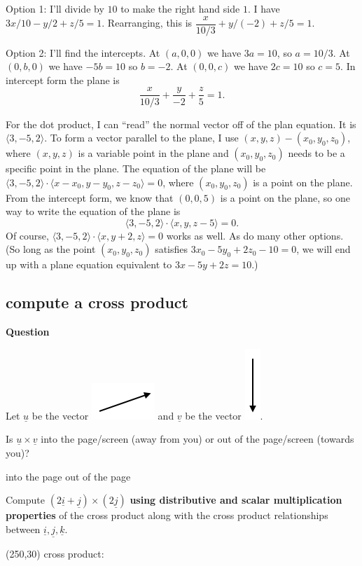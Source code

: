 \documentclass[12pt,letterpaper,noanswers]{exam}
\newcommand{\mb}[1]{\underline{#1}}
\begin{document}
Option 1: I'll divide by $10$ to make the right hand side $1$.  I have $3x/10 - y/2 + z/5 = 1$.  Rearranging, this is $\dfrac{x}{10/3} + y/(-2) + z/5 = 1$.

Option 2: I'll find the intercepts.  At $(a,0,0)$ we have $3a = 10$, so $a = 10/3$.  At $(0,b,0)$ we have $-5b = 10$ so $b = -2$.  At $(0,0,c)$ we have $2c = 10$ so $c=5$.  In intercept form the plane is \[\frac{x}{10/3}+\frac{y}{-2}+\frac{z}{5} = 1.\]

For the dot product, I can ``read'' the normal vector off of the plan equation.  It is $\langle 3,-5,2\rangle$.  To form a vector parallel to the plane, I use $(x,y,z) - (x_0,y_0,z_0)$, where $(x,y,z)$ is a variable point in the plane and $(x_0,y_0,z_0)$ needs to be a specific point in the plane.  The equation of the plane will be $\langle 3,-5,2\rangle \cdot \langle x-x_0,y-y_0,z-z_0\rangle = 0$, where $(x_0,y_0,z_0)$ is a point on the plane.  From the intercept form, we know that $(0,0,5)$ is a point on the plane, so one way to write the equation of the plane is
\[\langle 3,-5,2\rangle \cdot \langle x,y,z-5\rangle = 0.\] Of course, 
$\langle 3,-5,2\rangle \cdot \langle x,y+2,z\rangle = 0$ works as well.  As do many other options.  (So long as the point $(x_0,y_0,z_0)$ satisfies $3x_0 - 5y_0 +2z_0 - 10 = 0$, we will end up with a plane equation equivalent to $3x-5y+2z=10$.)


\subsection{compute a cross product}

\noindent\textbf{Question}

\begin{questions}
\item Let $\mb{u}$ be the vector \includegraphics[scale=0.5]{img/C06p1a.png} and $\mb{v}$ be the vector \includegraphics[scale=0.5]{img/C06p1b.png}.

Is $\mb{u}\times\mb{v}$ into the page/screen (away from you) or out of the page/screen (towards you)?

\begin{oneparcheckboxes}
\choice into the page
\choice out of the page
\end{oneparcheckboxes}

\item Compute $(2\mb{i}+\mb{j})\times(2\mb{j})$ \textbf{using distributive and scalar multiplication properties} of the cross product along with the cross product relationships between $\mb{i},\mb{j},\mb{k}$.

\framebox(250,30){ cross product:\hfill }
\end{questions}
\end{document}
